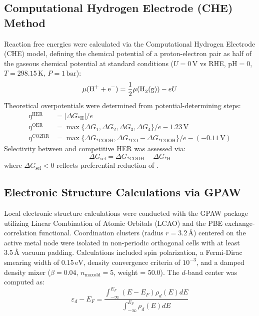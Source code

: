 \documentclass[journal=jacsat,manuscript=article]{achemso}
\begin{document}
\subsection{Computational Hydrogen Electrode (CHE) Method}
Reaction free energies were calculated via the Computational Hydrogen Electrode (CHE) model,\cite{norskov2004origin} defining the chemical potential of a proton-electron pair as half of the gaseous  chemical potential at standard conditions ($U = 0\,\text{V}$ vs RHE, $\text{pH} = 0$, $T = 298.15\,\text{K}$, $P = 1\,\text{bar}$):
\begin{equation}
\mu(\ce{H+ + e-}) = \frac{1}{2} \mu(\ce{H2(g)}) - e U
\end{equation}
Theoretical overpotentials were determined from potential-determining steps:
\begin{align}
\eta^{\text{HER}} &= |\Delta G_{*\text{H}}| / e \\
\eta^{\text{OER}} &= \max\{\Delta G_1, \Delta G_2, \Delta G_3, \Delta G_4\} / e - 1.23\,\text{V} \\
\eta^{\text{CO2RR}} &= \max\{\Delta G_{*\text{COOH}}, \Delta G_{*\text{CO}} - \Delta G_{*\text{COOH}}\} / e - (-0.11\,\text{V})
\end{align}
Selectivity between  and competitive HER was assessed via:
\begin{equation}
\Delta G_{\text{sel}} = \Delta G_{*\text{COOH}} - \Delta G_{*\text{H}}
\end{equation}
where $\Delta G_{\text{sel}} < 0$ reflects preferential reduction of .

\subsection{Electronic Structure Calculations via GPAW}
Local electronic structure calculations were conducted with the GPAW package\cite{mortensen2005real, enkovaara2010electronic} utilizing Linear Combination of Atomic Orbitals (LCAO) and the PBE exchange-correlation functional.\cite{perdew1996generalized} Coordination clusters (radius $r = 3.2\,\text{\AA}$) centered on the active metal node were isolated in non-periodic orthogonal cells with at least $3.5\,\text{\AA}$ vacuum padding. Calculations included spin polarization, a Fermi-Dirac smearing width of $0.15\,\text{eV}$, density convergence criteria of $10^{-3}$, and a damped density mixer ($\beta = 0.04$, $n_{\text{maxold}} = 5$, weight = 50.0). The $d$-band center was computed as:
\begin{equation}
\varepsilon_d - E_F = \frac{\int_{-\infty}^{E_F} (E - E_F) \rho_d(E) dE}{\int_{-\infty}^{E_F} \rho_d(E) dE}
\end{equation}
\end{document}
